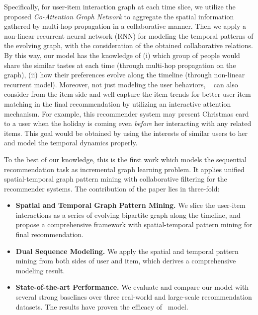 Specifically, for user-item interaction graph at each time slice, we utilize the proposed \textit{Co-Attention Graph Network} to aggregate the spatial information gathered by multi-hop propagation in a collaborative manner.
Then we apply a non-linear recurrent neural network (RNN) for modeling the temporal patterns of the evolving graph, with the consideration of the obtained collaborative relations.
By this way, our model has the knowledge of (i) which group of people would share the similar tastes at each time (through multi-hop propagation on the graph), (ii) how their preferences evolve along the timeline (through non-linear recurrent model).
Moreover, not just modeling the user behaviors, \score~ can also consider from the item side and well capture the item trends for better user-item matching in the final recommendation by utilizing an interactive attention mechanism.
For example, this recommender system may present Christmas card to a user when the holiday is coming even \textit{before} her interacting with any related items. This goal would be obtained by using the interests of similar users to her and model the temporal dynamics properly.

To the best of our knowledge, this is the first work which models the sequential recommendation task as incremental graph learning problem. It applies unified spatial-temporal graph pattern mining with collaborative filtering for the recommender systems.
The contribution of the paper lies in three-fold:
\begin{itemize}[leftmargin=5mm]
	\item \textbf{Spatial and Temporal Graph Pattern Mining.} We slice the user-item interactions as a series of evolving bipartite graph along the timeline, and propose a comprehensive framework with spatial-temporal pattern mining for final recommendation.
	\item \textbf{Dual Sequence Modeling.} We apply the spatial and temporal pattern mining from both sides of user and item, which derives a comprehensive modeling result.
	\item \textbf{State-of-the-art Performance.} We evaluate and compare our model with several strong baselines over three real-world and large-scale recommendation datasets. The results have proven the efficacy of \score ~model.
\end{itemize}

